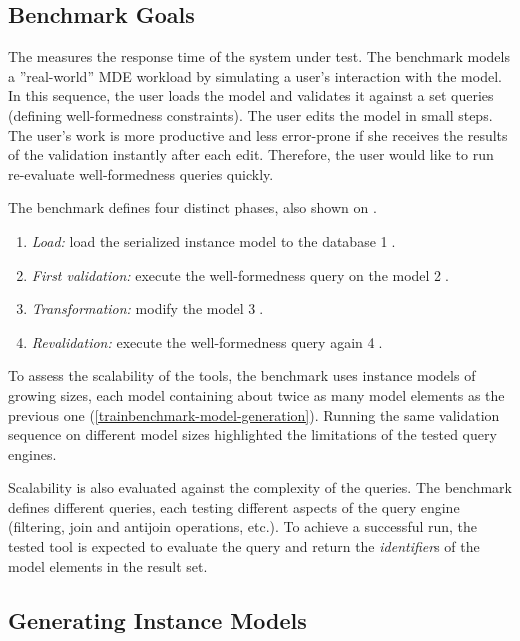 \subsection{Benchmark Goals}

The \tb{} measures the response time of the system under test. The benchmark models a ''real-world'' MDE workload by simulating a user's interaction with the model. In this sequence, the user loads the model and validates it against a set  queries (defining well-formedness constraints). The user edits the model in small steps. The user's work is more productive and less error-prone if she receives the results of the validation instantly after each edit. Therefore, the user would like to run re-evaluate well-formedness queries quickly.


The benchmark defines four distinct phases, also shown on .

\begin{enumerate}
  \item \emph{Load:} load the serialized instance model to the database \textcircled{1}.
  \item \emph{First validation:} execute the well-formedness query on the model \textcircled{2}.
  \item \emph{Transformation:} modify the model \textcircled{3}.
  \item \emph{Revalidation:} execute the well-formedness query again \textcircled{4}.
\end{enumerate}

To assess the scalability of the tools, the benchmark uses instance models of growing sizes, each model containing about twice as many model elements as the previous one (\autoref{trainbenchmark-model-generation}). Running the same validation sequence on different model sizes highlighted the limitations of the tested query engines.

Scalability is also evaluated against the complexity of the queries. The benchmark defines different queries, each testing different aspects of the query engine (filtering, join and antijoin operations, etc.). To achieve a successful run, the tested tool is expected to evaluate the query and return the \emph{identifier}s of the model elements in the result set.

\subsection{Generating Instance Models}
\label{trainbenchmark-model-generation}

